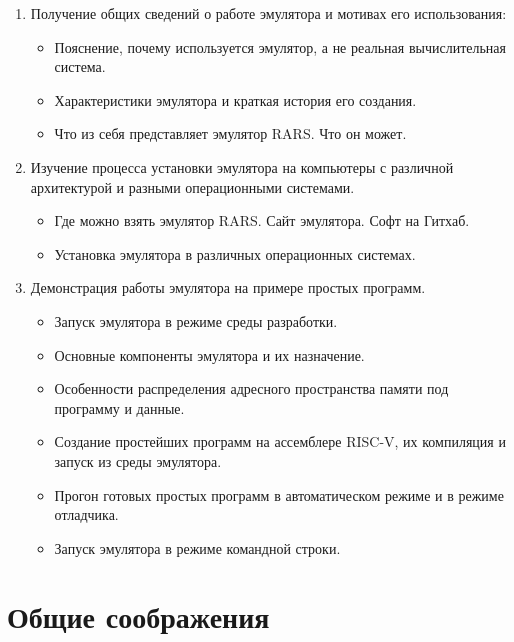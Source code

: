 \begin{enumerate}
    \item Получение общих сведений о работе эмулятора и мотивах его использования:
    \begin{itemize}
        \item Пояснение, почему используется эмулятор, а не реальная вычислительная система.
        \item Характеристики эмулятора и краткая история его создания.
        \item Что из себя представляет эмулятор RARS. Что он может.
    \end{itemize}
    \item Изучение процесса установки эмулятора на компьютеры с различной архитектурой и разными операционными системами.
    \begin{itemize}
        \item Где можно взять эмулятор RARS. Сайт эмулятора. Софт на Гитхаб.
        \item Установка эмулятора в различных операционных системах.
    \end{itemize}
    \item Демонстрация работы эмулятора на примере простых программ.
    \begin{itemize}
        \item Запуск эмулятора в режиме среды разработки.
        \item Основные компоненты эмулятора и их назначение.
        \item Особенности распределения адресного пространства памяти под программу и данные.
        \item Создание простейших программ на ассемблере RISC-V, их компиляция и запуск из среды эмулятора.
        \item Прогон готовых простых программ в автоматическом режиме и в режиме отладчика.
        \item Запуск эмулятора в режиме командной строки.
    \end{itemize}
\end{enumerate}

\section{Общие соображения}


